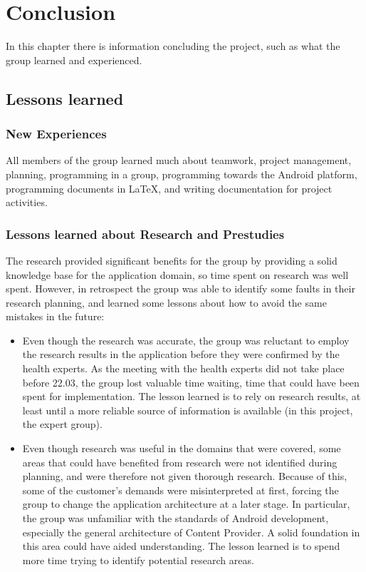 \chapter{Conclusion}
In this chapter there is information concluding the project, such as what the group learned and experienced.
\section{Lessons learned}

\subsection{New Experiences}
All members of the group learned much about teamwork, project management, planning, programming in a group, programming towards the Android platform, programming documents in LaTeX, and writing documentation for project activities. 


\subsection{Lessons learned about Research and Prestudies}
The research provided significant benefits for the group by providing a solid knowledge base for the application domain, so time spent on research was well spent. However, in retrospect the group was able to identify some faults in their research planning, and learned some lessons about how to avoid the same mistakes in the future:

\begin{itemize}
\item
Even though the research was accurate, the group was reluctant to employ the research results in the application before they were confirmed by the health experts. As the meeting with the health experts did not take place before 22.03, the group lost valuable time waiting, time that could have been spent for implementation. The lesson learned is to rely on research results, at least until a more reliable source of information is available (in this project, the expert group).
\item
Even though research was useful in the domains that were covered, some areas that could have benefited from research were not identified during planning, and were therefore not given thorough research. Because of this, some of the customer's demands were misinterpreted at first, forcing the group to change the application architecture at a later stage. In particular, the group was unfamiliar with the standards of Android development, especially the general architecture of Content Provider. A solid foundation in this area could have aided understanding. The lesson learned is to spend more time trying to identify potential research areas. 
\end{itemize}

